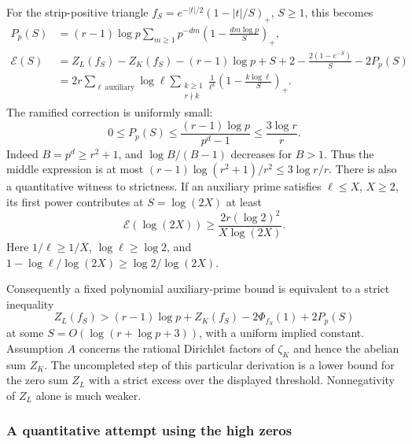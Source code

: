 \documentclass[11pt]{article}
\theoremstyle{definition}
\theoremstyle{remark}
\begin{document}
For the strip-positive triangle $f_S=e^{-|t|/2}(1-|t|/S)_+$,
$S\geq1$, this becomes
\begin{align}
 P_p(S)&=(r-1)\log p\sum_{m\geq1}p^{-dm}
                  \left(1-\frac{dm\log p}{S}\right)_+,
                  \label{eq:kummer-ramified-correction}\\
 \mathcal E(S)&=Z_L(f_S)-Z_K(f_S)-(r-1)\log p
           +S+2-\frac{2(1-e^{-S})}{S}-2P_p(S)
                  \label{eq:kummer-triangle-excess}\\
 &=2r\sum_{\ell\ \mathrm{auxiliary}}\log\ell
       \sum_{\substack{k\geq1\\r\nmid k}}
          \frac1{\ell^k}
          \left(1-\frac{k\log\ell}{S}\right)_+.
                  \nonumber
\end{align}
The ramified correction is uniformly small:
\begin{equation}\label{eq:kummer-ramified-small}
 0\leq P_p(S)\leq\frac{(r-1)\log p}{p^d-1}
                          \leq\frac{3\log r}{r}.
\end{equation}
Indeed $B=p^d\geq r^2+1$, and $\log B/(B-1)$ decreases
for $B>1$.  Thus the middle expression is at most
$(r-1)\log(r^2+1)/r^2\leq3\log r/r$.
There is also a quantitative witness to strictness.  If an
auxiliary prime satisfies $\ell\leq X$, $X\geq2$, its first
power contributes at $S=\log(2X)$ at least
\begin{equation}\label{eq:kummer-positive-gap}
 \mathcal E(\log(2X))
 \geq \frac{2r(\log2)^2}{X\log(2X)}.
\end{equation}
Here $1/\ell\geq1/X$, $\log\ell\geq\log2$, and
$1-\log\ell/\log(2X)\geq\log2/\log(2X)$.

Consequently a fixed polynomial auxiliary-prime bound is
equivalent to a strict inequality
\[
 Z_L(f_S)>
 (r-1)\log p+Z_K(f_S)-2\Phi_{f_S}(1)+2P_p(S)
\]
at some $S=O(\log(r+\log p+3))$, with a uniform implied
constant.  Assumption $A$ concerns the rational Dirichlet
factors of $\zeta_K$ and hence the abelian sum $Z_K$.
The uncompleted step of this particular derivation is a lower bound
for the zero sum $Z_L$ with a strict excess over the displayed
threshold.  Nonnegativity of $Z_L$ alone is much weaker.

\subsubsection{A quantitative attempt using the high zeros}
\end{document}
